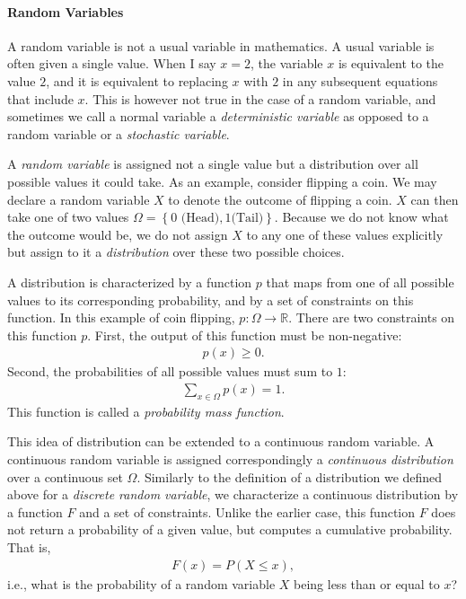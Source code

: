 \documentclass{report}
\newcommand{\RR}[0]{\mathbb{R}}
\begin{document}
\paragraph{Random Variables}

A random variable is not a usual variable in mathematics. A usual variable is
often given a single value. When I say $x=2$, the variable $x$ is equivalent to
the value $2$, and it is equivalent to replacing $x$ with $2$ in any subsequent
equations that include $x$. This is however not true in the case of a random
variable, and sometimes we call a normal variable a {\it deterministic variable}
as opposed to a random variable or a {\it stochastic variable}.

A {\it random variable} is assigned not a single value but a distribution over
all possible values it could take. As an example, consider flipping a coin. We
may declare a random variable $X$ to denote the outcome of flipping a coin. $X$
can then take one of two values $\Omega = \left\{0\text{ (Head)}, 1\text{
(Tail)}\right\}$.  Because we do not know what the outcome would be, we do not
assign $X$ to any one of these values explicitly but assign to it a {\it
distribution} over these two possible choices. 

A distribution is characterized by a function $p$ that maps from one of all
possible values to its corresponding probability, and by a set of constraints on
this function. In this example of coin flipping, $p: \Omega \to \RR$. There are
two constraints on this function $p$. First, the output of this function must be
non-negative:
\begin{align*}
    p(x) \geq 0.
\end{align*}
Second, the probabilities of all possible values must sum to $1$:
\begin{align*}
    \sum_{x \in \Omega} p(x) = 1.
\end{align*}
This function is called a {\it probability mass function}. 

This idea of distribution can be extended to a continuous random variable. A
continuous random variable is assigned correspondingly a {\it continuous
distribution} over a continuous set $\Omega$. Similarly to the definition of a
distribution we defined above for a {\it discrete random variable}, we
characterize a continuous distribution by a function $F$ and a set of
constraints.  Unlike the earlier case, this function $F$ does not return a
probability of a given value, but computes a cumulative probability. That is,
\begin{align}
    \label{eq:cdf}
    F(x) = P(X \leq x),
\end{align}
i.e., what is the probability of a random variable $X$ being less than or equal
to $x$? 
\end{document}
